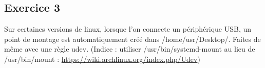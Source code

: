 \documentclass[11pt]{article}
\begin{document}
\subsection*{Exercice 3}

Sur certaines versions de linux, lorsque l'on connecte un périphérique USB, un point de montage 
est automatiquement créé dans /home/usr/Desktop/. Faites de même avec une règle udev. 
(Indice : utiliser /usr/bin/systemd-mount au lieu de /usr/bin/mount : \url{https://wiki.archlinux.org/index.php/Udev})

 \bigskip
\end{document}
